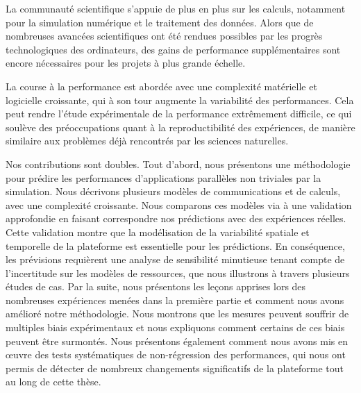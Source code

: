 La communauté scientifique s'appuie de plus en plus sur les calculs, notamment pour la simulation numérique et le
traitement des données. Alors que de nombreuses avancées scientifiques ont été rendues possibles par les progrès
technologiques des ordinateurs, des gains de performance supplémentaires sont encore nécessaires pour les projets à plus
grande échelle.

La course à la performance est abordée avec une complexité matérielle et logicielle croissante, qui à son tour augmente
la variabilité des performances. Cela peut rendre l'étude expérimentale de la performance extrêmement difficile, ce qui
soulève des préoccupations quant à la reproductibilité des expériences, de manière similaire aux problèmes déjà
rencontrés par les sciences naturelles.

Nos contributions sont doubles. Tout d'abord, nous présentons une méthodologie pour prédire les performances
d'applications parallèles non triviales par la simulation.  Nous décrivons plusieurs modèles de communications et de
calculs, avec une complexité croissante. Nous comparons ces modèles via à une validation approfondie en faisant
correspondre nos prédictions avec des expériences réelles. Cette validation montre que la modélisation de la variabilité
spatiale et temporelle de la plateforme est essentielle pour les prédictions. En conséquence, les prévisions requièrent
une analyse de sensibilité minutieuse tenant compte de l'incertitude sur les modèles de ressources, que nous illustrons
à travers plusieurs études de cas. Par la suite, nous présentons les leçons apprises lors des nombreuses expériences
menées dans la première partie et comment nous avons amélioré notre méthodologie. Nous montrons que les mesures peuvent
souffrir de multiples biais expérimentaux et nous expliquons comment certains de ces biais peuvent être surmontés. Nous
présentons également comment nous avons mis en œuvre des tests systématiques de non-régression des performances, qui
nous ont permis de détecter de nombreux changements significatifs de la plateforme tout au long de cette thèse.
